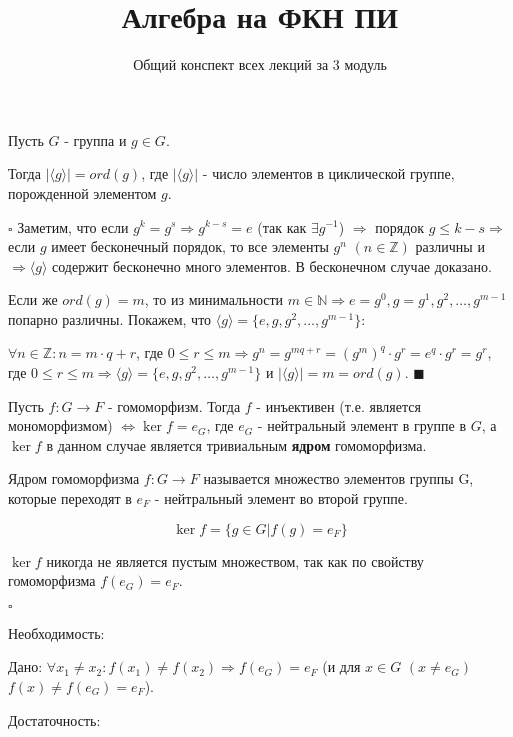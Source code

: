 \documentclass[a4paper,11pt]{article}
\title{Алгебра на ФКН ПИ}
\author{Общий конспект всех лекций за 3 модуль}
\newcommand{\stmnt}[1]{\fbox{\textbf{#1}}}
\newcommand{\void}{\vspace{\baselineskip}}
\newcommand{\N}{\mathbb{N}}
\newcommand{\Z}{\mathbb{Z}}
\newcommand{\abs}[1]{\vert #1\vert}
\begin{document}
    \maketitle

    \stmnt{Утв} Пусть $G$ - группа и $g\in G$.

    Тогда $\abs{\langle g\rangle} = ord(g)$, где $\abs{\langle g\rangle}$ - число элементов в циклической группе, порожденной элементом $g$.

    \void
    $\square$ Заметим, что если $g^k = g^s \Rightarrow g^{k-s} = e$ (так как $\exists g^{-1}$) $\Rightarrow$
    порядок $g \leq k - s \Rightarrow$ если $g$ имеет бесконечный порядок, то все элементы $g^n$ $(n\in\Z)$
    различны и $\Rightarrow \langle g\rangle$ содержит бесконечно много элементов. В бесконечном случае доказано.
    
    \void
    Если же $ord(g) = m$, то из минимальности $m\in\N \Rightarrow e=g^0, g=g^1, g^2,\dots,g^{m-1}$ попарно
    различны. Покажем, что $\langle g\rangle = \{e, g, g^2,\dots,g^{m-1}\}$:

    $\forall n\in\Z: n = m\cdot q + r$, где $0\leq r \le m \Rightarrow g^n = g^{mq+r} = (g^m)^q\cdot g^r =
    e^q\cdot g^r = g^r$, где $0\leq r\le m \Rightarrow \langle g\rangle = \{e,g,g^2,\dots,g^{m-1}\}$
    и $\abs{\langle g\rangle} = m = ord(g)$. $\blacksquare$

    \void
    \stmnt{Утв} Пусть $f: G\rightarrow F$ - гомоморфизм. Тогда $f$ - инъективен (т.е. является мономорфизмом)
    $\Leftrightarrow \ker{f} = e_G$, где $e_G$ - нейтральный элемент в группе в $G$, а $\ker{f}$ в данном
    случае является тривиальным \textbf{ядром} гомоморфизма.

    \void
    \stmnt{Опр} Ядром гомоморфизма $f: G\rightarrow F$ называется множество элементов группы G, которые переходят
    в $e_F$ - нейтральный элемент во второй группе.

    $$\ker{f} = \{g\in G\vert f(g) = e_F\}$$

    \void
    \stmnt{Зам} $\ker{f}$ никогда не является пустым множеством, так как по свойству гомоморфизма $f(e_G) = e_F$.

    \void
    $\square$

    \fbox{$\Rightarrow$} Необходимость:

    Дано: $\forall x_1 \neq x_2: f(x_1)\neq f(x_2)\Rightarrow f(e_G) = e_F$ 
    (и для $x\in G$ $(x\neq e_G)$ $f(x)\neq f(e_G) = e_F$).

    \fbox{$\Leftarrow$} Достаточность:
\end{document}
